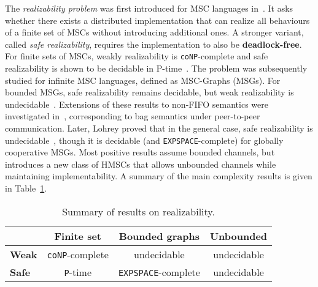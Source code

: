 The \emph{realizability problem} was first introduced for MSC languages 
in~\cite{alur2000inference,alur2003inference}. It asks whether there exists a distributed 
implementation that can realize all behaviours of a finite set of MSCs 
without introducing additional ones. A stronger variant, called 
\emph{safe realizability}, requires the implementation to also be \textbf{deadlock-free}. 
For finite sets of MSCs, weakly realizability is \verb|coNP|-complete and safe 
realizability is shown to be decidable in P-time~\cite{alur2005realizability}.
The problem was subsequently studied for infinite MSC languages, defined 
as MSC-Graphs (MSGs). For bounded MSGs, safe realizability 
remains decidable, but weak realizability 
is undecidable~\cite{alur2005realizability}. Extensions of these results to non-FIFO 
semantics were investigated in~\cite{morin2002recognizable}, corresponding 
to bag semantics under peer-to-peer communication. 
Later, Lohrey proved that in the general case, safe realizability 
is undecidable~\cite{lohrey2003realizability}, though it is decidable (and 
\verb|EXPSPACE|-complete) for globally cooperative MSGs.
Most positive results assume bounded channels, but \cite{bollig2025high} introduces 
a new class of HMSCs that allows unbounded channels while maintaining implementability.
A summary of the main complexity results is given in Table~\ref{tab:realizability}.

\begin{table}[!ht]
	\centering
	\begin{tabular}{|l|c|c|c|}
		\hline
		& \textbf{Finite set} & \textbf{Bounded graphs} & \textbf{Unbounded} \\
		\hline
		\textbf{Weak} & \verb|coNP|-complete & undecidable & undecidable \\
		\hline
		\textbf{Safe} & \verb|P|-time & \verb|EXPSPACE|-complete & undecidable \\
		\hline
	\end{tabular}
	\caption{Summary of results on realizability.}
	\label{tab:realizability}
\end{table}



